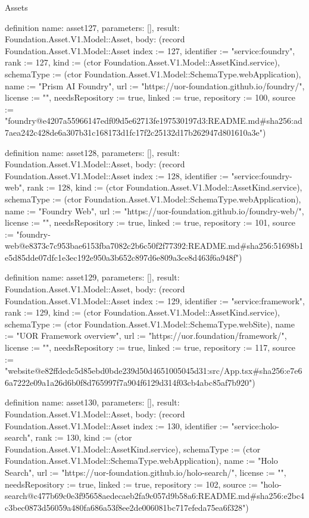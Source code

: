 \begin{lexlean}{Assets}
\begin{semanticmodule}
definition{
  name: asset127,
  parameters: [],
  result: Foundation.Asset.V1.Model::Asset,
  body: (record Foundation.Asset.V1.Model::Asset {index := 127, identifier := "service:foundry", rank := 127, kind := (ctor Foundation.Asset.V1.Model::AssetKind.service), schemaType := (ctor Foundation.Asset.V1.Model::SchemaType.webApplication), name := "Prism AI Foundry", url := "https://uor-foundation.github.io/foundry/", license := "", needsRepository := true, linked := true, repository := 100, source := "foundry@e4207a55966147edf09d5e62713fe197530197d3:README.md#sha256:ad7aea242c428de6a307b31c168173d1fc17f2c25132d17b262947d801610a3e"})
}

definition{
  name: asset128,
  parameters: [],
  result: Foundation.Asset.V1.Model::Asset,
  body: (record Foundation.Asset.V1.Model::Asset {index := 128, identifier := "service:foundry-web", rank := 128, kind := (ctor Foundation.Asset.V1.Model::AssetKind.service), schemaType := (ctor Foundation.Asset.V1.Model::SchemaType.webApplication), name := "Foundry Web", url := "https://uor-foundation.github.io/foundry-web/", license := "", needsRepository := true, linked := true, repository := 101, source := "foundry-web@e8373c7c953bae6153fba7082c2b6c50f2f77392:README.md#sha256:51698b1e5d85dde07dfc1e3ec192e950a3b652c897d6e809a3ce8d463f6a948f"})
}

definition{
  name: asset129,
  parameters: [],
  result: Foundation.Asset.V1.Model::Asset,
  body: (record Foundation.Asset.V1.Model::Asset {index := 129, identifier := "service:framework", rank := 129, kind := (ctor Foundation.Asset.V1.Model::AssetKind.service), schemaType := (ctor Foundation.Asset.V1.Model::SchemaType.webSite), name := "UOR Framework overview", url := "https://uor.foundation/framework/", license := "", needsRepository := true, linked := true, repository := 117, source := "website@e82ffdedc5d85ebd0bde239d50d4651005045d31:src/App.tsx#sha256:e7e66a7222e09a1a26d6b0f8d765997f7a904f6129d314f03cb4abc85af7b920"})
}

definition{
  name: asset130,
  parameters: [],
  result: Foundation.Asset.V1.Model::Asset,
  body: (record Foundation.Asset.V1.Model::Asset {index := 130, identifier := "service:holo-search", rank := 130, kind := (ctor Foundation.Asset.V1.Model::AssetKind.service), schemaType := (ctor Foundation.Asset.V1.Model::SchemaType.webApplication), name := "Holo Search", url := "https://uor-foundation.github.io/holo-search/", license := "", needsRepository := true, linked := true, repository := 102, source := "holo-search@c477b69c0e3f95658aedecaeb2fa9c057d9b58a6:README.md#sha256:e2bc4c3bec0873d56059a480fa686a53f8ee2de006081bc717efeda75ea6f328"})
}


\end{semanticmodule}
\end{lexlean}
